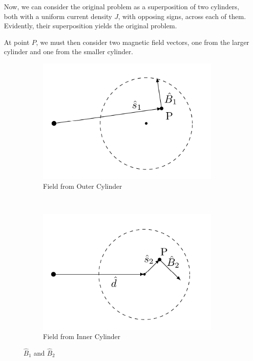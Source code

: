 \documentclass{article}
\begin{document}
\begin{figure}[ht!]
\centering
{}
\end{figure}

Now, we can consider the original problem as a superposition of two cylinders, both with a uniform current density $J$, with opposing signs, across each of them. Evidently, their superposition yields the original problem. 
\vspace{3mm}

At point $P$, we must then consider two magnetic field vectors, one from the larger cylinder and one from the smaller cylinder. 

\begin{figure}[ht!]
    \centering
    \begin{subfigure}[b]{0.5\textwidth}
        \centering
        \includegraphics[width=0.5\linewidth]{figures/vec1.png}
        \caption{Field from Outer Cylinder}
    \end{subfigure}%
    ~ 
    \begin{subfigure}[b]{0.5\textwidth}
        \centering
        \includegraphics[width=0.5\linewidth]{figures/vec2.png}
        \caption{Field from Inner Cylinder}
    \end{subfigure}
    \caption{$\hat{B}_1$ and $\hat{B}_2$}
\end{figure}
\end{document}
